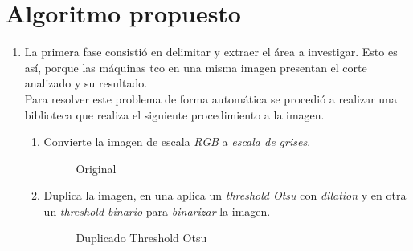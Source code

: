 \section{Algoritmo propuesto}
\begin{enumerate}
\item La primera fase consistió en delimitar y extraer el
  área a investigar. Esto es así, porque las
  máquinas \gls{tco} en una misma
  imagen presentan el corte analizado y su resultado.\\
  Para resolver este problema de forma automática se procedió a
  realizar una biblioteca que realiza el siguiente procedimiento a la
  imagen.
  \begin{enumerate}[label*=\arabic*.]
  \item Convierte la imagen de escala \emph{RGB} a \emph{escala de
      grises}.

    \begin{figure}[H]
      \caption{Original}
      \centering \setlength\fboxsep{0pt} \setlength\fboxrule{0.5pt}
    \end{figure}

  \item Duplica la imagen, en una aplica un \emph{threshold
      Otsu} con
    \emph{dilation} y en otra un
    \emph{threshold binario}
    para \emph{binarizar} la imagen.
 
    \begin{figure}[H]
      \caption{Duplicado Threshold Otsu}
      \centering \setlength\fboxsep{0pt} \setlength\fboxrule{0.5pt}
    \end{figure}


\end{enumerate}
\end{enumerate}
